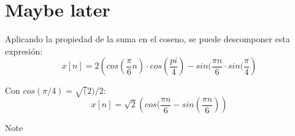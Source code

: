\newpage
\section{Maybe later}
		 Aplicando la propiedad de la suma en el coseno, se puede descomponer esta expresión:
		 \begin{equation*}
		 	x[n] = 2 \left ( cos(\frac{\pi}{6}n) \cdot cos(\frac{pi}{4}) - sin(\frac{\pi n}{6} \cdot sin(\frac{\pi}{4} \right)
		 \end{equation*}
		 
		 Con $cos(\pi/4) = \sqrt(2)/2$:
		 \begin{equation*}
		 	x[n] = \sqrt{2} \left( cos(\frac{\pi n }{6} - sin(\frac{\pi n}{6}) \right)
		 \end{equation*}		  
		
		Note 
		
